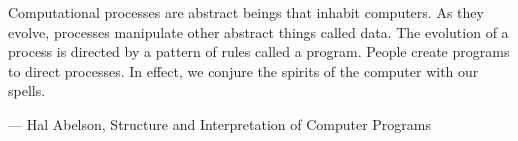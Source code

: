 \documentclass[twoside]{esi-tfg}
\begin{document}
\cover
\bastardtitle
\frontpage

\frontmatter
\copyrightpage
\jury




\dedication{To my parents and Yolanda}
\epigraph{Computational processes are abstract beings that inhabit computers. As they evolve, processes manipulate other abstract things called data. The evolution of a process is directed by a pattern of rules called a program. People create programs to direct processes. In effect, we conjure the spirits of the computer with our spells.}{--- \textup{Hal Abelson}, Structure and Interpretation of Computer Programs}


\tableofcontents
\listoftables
\listoffigures
\lstlistoflistings


\mainmatter








\backmatter

\appendix
\appendixtitle

{\small }


\cleardoublepage
\end{document}
